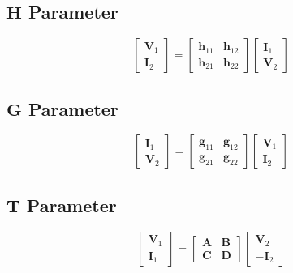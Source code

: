 	\subsection*{$\mathbf{H}$ Parameter} \label{subsec:H Parameter}
		\begin{equation*} \label{eq:H Parameter}
			\begin{bmatrix}
				\mathbf{V}_{1} \\
				\mathbf{I}_{2} 
			\end{bmatrix}
			=\begin{bmatrix}
				\mathbf{h}_{11} & \mathbf{h}_{12} \\
				\mathbf{h}_{21} & \mathbf{h}_{22}
			\end{bmatrix}
			\begin{bmatrix}
				\mathbf{I}_{1} \\
				\mathbf{V}_{2} 
			\end{bmatrix}
		\end{equation*}


	\subsection*{$\mathbf{G}$ Parameter} \label{subsec:G Parameter}
		\begin{equation*} \label{eq:G Parameter}
			\begin{bmatrix}
				\mathbf{I}_{1} \\
				\mathbf{V}_{2} 
			\end{bmatrix}
			=\begin{bmatrix}
				\mathbf{g}_{11} & \mathbf{g}_{12} \\
				\mathbf{g}_{21} & \mathbf{g}_{22}
			\end{bmatrix}
			\begin{bmatrix}
				\mathbf{V}_{1} \\
				\mathbf{I}_{2} 
			\end{bmatrix}
		\end{equation*}
	
	\subsection*{$\mathbf{T}$ Parameter} \label{subsec:T Parameter}
		\begin{equation*} \label{eq:T Parameter}
			\begin{bmatrix}
				\mathbf{V}_{1} \\
				\mathbf{I}_{1} 
			\end{bmatrix}
			=\begin{bmatrix}
				\mathbf{A} & \mathbf{B} \\
				\mathbf{C} & \mathbf{D}
			\end{bmatrix}
			\begin{bmatrix}
				\mathbf{V}_{2} \\
				\mathbf{-I}_{2} 
			\end{bmatrix}
	\end{equation*}
	
